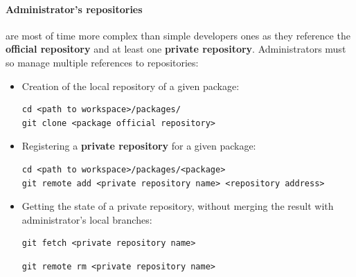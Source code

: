\documentclass[12pt,a4paper]{article}
\begin{document}
\paragraph{Administrator's repositories} are most of time more complex than simple developers ones as they reference the \textbf{official repository} and at least one \textbf{private repository}. Administrators must so manage multiple references to repositories:
\begin{itemize}
\item Creation of the local repository of a given package:
\begin{verbatim}
cd <path to workspace>/packages/
git clone <package official repository>
\end{verbatim}
\item Registering a \textbf{private repository} for a given package:
\begin{verbatim}
cd <path to workspace>/packages/<package>
git remote add <private repository name> <repository address>
\end{verbatim}
\item Getting the state of a private repository, without merging the result with administrator's local branches:
\begin{verbatim}
git fetch <private repository name>
\end{verbatim}
\begin{verbatim}
git remote rm <private repository name>
\end{verbatim}
\end{itemize}
\end{document}
